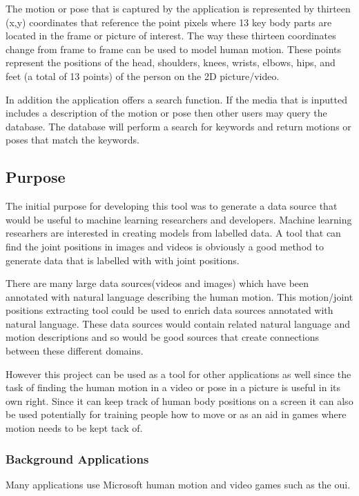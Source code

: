 \documentclass{scrreprt}
\begin{document}
  The motion or pose that is captured by the application is represented by thirteen (x,y) coordinates that reference the point pixels where 13 key body parts are located in the frame or picture of interest.  The way these thirteen coordinates change from frame to frame can be used to model human motion.  These points represent the positions of the head, shoulders, knees, wrists, elbows, hips, and feet (a total of 13 points) of the person on the 2D picture/video.

	In addition the application offers a search function.  If the media that is inputted includes a description of the motion or pose then other users may query the database.  The database will perform a search for keywords and return motions or poses that match the keywords.

\subsection{Purpose}
The initial purpose for developing this tool was to generate a data source that would be useful to machine learning researchers and developers.  Machine learning researhers are interested in creating models from labelled data.  A tool that can find the joint positions in images and videos is obviously a good method to generate data that is labelled with with joint positions.  

There are many large data sources(videos and images) which have been annotated with natural language describing the human motion. This motion/joint positions extracting tool could be used to enrich data sources annotated with natural language.  These data sources would contain related natural language  and motion descriptions and so would be good sources that create connections between these different domains.
 
However this project can be used as a tool for other applications as well since the task of finding the human motion in a video or pose in a picture is useful in its own right.  
Since it can keep track of human body positions on a screen it can also be used potentially for training people how to move or as an aid in games where motion needs to be kept tack of.


\subsubsection{Background Applications}
Many applications use Microsoft human motion and video games such as the oui.
\end{document}
